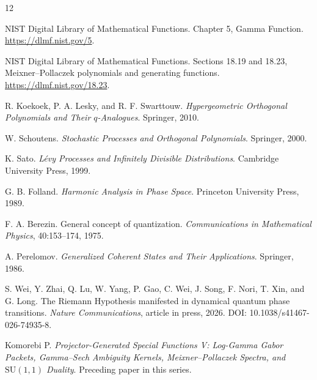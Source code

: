 \documentclass[11pt,openany]{report}
\theoremstyle{definition}
\theoremstyle{remark}
\begin{document}
\begin{thebibliography}{12}

NIST Digital Library of Mathematical Functions.
Chapter 5, Gamma Function.
\url{https://dlmf.nist.gov/5}.

NIST Digital Library of Mathematical Functions.
Sections 18.19 and 18.23, Meixner--Pollaczek polynomials and generating functions.
\url{https://dlmf.nist.gov/18.23}.

R. Koekoek, P. A. Lesky, and R. F. Swarttouw.
\emph{Hypergeometric Orthogonal Polynomials and Their $q$-Analogues}.
Springer, 2010.

W. Schoutens.
\emph{Stochastic Processes and Orthogonal Polynomials}.
Springer, 2000.

K. Sato.
\emph{L\'evy Processes and Infinitely Divisible Distributions}.
Cambridge University Press, 1999.

G. B. Folland.
\emph{Harmonic Analysis in Phase Space}.
Princeton University Press, 1989.

F. A. Berezin.
General concept of quantization.
\emph{Communications in Mathematical Physics}, 40:153--174, 1975.

A. Perelomov.
\emph{Generalized Coherent States and Their Applications}.
Springer, 1986.

S. Wei, Y. Zhai, Q. Lu, W. Yang, P. Gao, C. Wei, J. Song, F. Nori, T. Xin, and G. Long.
The Riemann Hypothesis manifested in dynamical quantum phase transitions.
\emph{Nature Communications}, article in press, 2026.
DOI: 10.1038/s41467-026-74935-8.

Komorebi P.
\emph{Projector-Generated Special Functions V: Log-Gamma Gabor Packets, Gamma--Sech Ambiguity Kernels, Meixner--Pollaczek Spectra, and $\mathrm{SU}(1,1)$ Duality}.
Preceding paper in this series.

\end{thebibliography}
\end{document}
